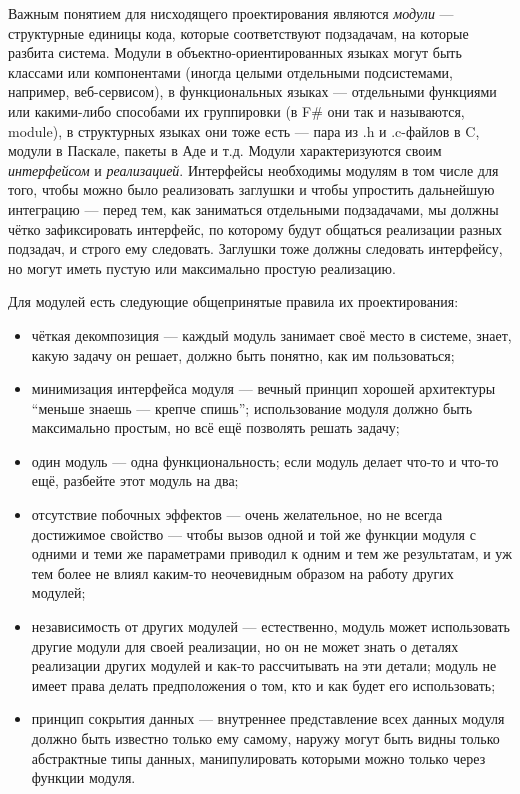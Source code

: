 \documentclass[a5paper]{article}
\begin{document}
Важным понятием для нисходящего проектирования являются \textit{модули} --- структурные единицы кода, которые соответствуют подзадачам, на которые разбита система. Модули в объектно-ориентированных языках могут быть классами или компонентами (иногда целыми отдельными подсистемами, например, веб-сервисом), в функциональных языках --- отдельными функциями или какими-либо способами их группировки (в F\# они так и называются, module), в структурных языках они тоже есть --- пара из .h и .c-файлов в C, модули в Паскале, пакеты в Аде и т.д. Модули характеризуются своим \textit{интерфейсом} и \textit{реализацией}. Интерфейсы необходимы модулям в том числе для того, чтобы можно было реализовать заглушки и чтобы упростить дальнейшую интеграцию --- перед тем, как заниматься отдельными подзадачами, мы должны чётко зафиксировать интерфейс, по которому будут общаться реализации разных подзадач, и строго ему следовать. Заглушки тоже должны следовать интерфейсу, но могут иметь пустую или максимально простую реализацию.

Для модулей есть следующие общепринятые правила их проектирования:

\begin{itemize}
	\item чёткая декомпозиция --- каждый модуль занимает своё место в системе, знает, какую задачу он решает, должно быть понятно, как им пользоваться;
	\item минимизация интерфейса модуля --- вечный принцип хорошей архитектуры ``меньше знаешь --- крепче спишь''; использование модуля должно быть максимально простым, но всё ещё позволять решать задачу;
	\item один модуль --- одна функциональность; если модуль делает что-то и что-то ещё, разбейте этот модуль на два;
	\item отсутствие побочных эффектов --- очень желательное, но не всегда достижимое свойство --- чтобы вызов одной и той же функции модуля с одними и теми же параметрами приводил к одним и тем же результатам, и уж тем более не влиял каким-то неочевидным образом на работу других модулей;
	\item независимость от других модулей --- естественно, модуль может использовать другие модули для своей реализации, но он не может знать о деталях реализации других модулей и как-то рассчитывать на эти детали; модуль не имеет права делать предположения о том, кто и как будет его использовать;
	\item принцип сокрытия данных --- внутреннее представление всех данных модуля должно быть известно только ему самому, наружу могут быть видны только абстрактные типы данных, манипулировать которыми можно только через функции модуля.
\end{itemize}
\end{document}
